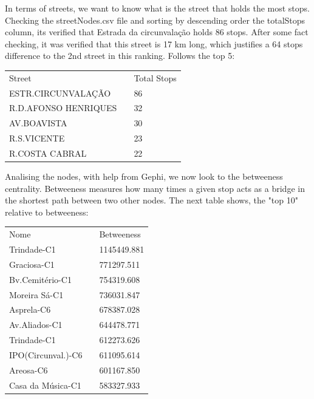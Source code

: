 \documentclass[12pt]{article}
\begin{document}
\begin{multicols}{2}
In terms of streets, we want to know what is the street that holds the most stops. Checking the streetNodes.csv file and sorting by descending order the totalStops column, its verified that Estrada da circunvalação holds 86 stops. After some fact checking, it was verified that this street is 17 km long, which justifies a 64 stops difference to the 2nd street in this ranking. Follows the top 5:
\begin{center}
\begin{tabular}[h]{|l|ll|}
\hline
Street && Total Stops\\
ESTR.CIRCUNVALAÇÃO && 86\\
R.D.AFONSO HENRIQUES && 32\\
AV.BOAVISTA	&& 30\\
R.S.VICENTE	&& 23\\
R.COSTA CABRAL && 22\\
\hline
\end{tabular}
\end{center} 
Analising the nodes, with help from Gephi, we now look to the betweeness centrality. Betweeness measures how many times a given stop acts as a bridge in the shortest path between two other nodes. The next table shows, the "top 10" relative to betweeness:\\
\begin{tabular}[h]{|l|ll|}
\hline
	Nome 				&& Betweeness\\
	Trindade-C1 		&& 1145449.881\\%
	Graciosa-C1 		&& 771297.511\\%
	Bv.Cemitério-C1 	&& 754319.608\\%
	Moreira Sá-C1 		&& 736031.847\\%
	Asprela-C6 			&& 678387.028\\%
	Av.Aliados-C1 		&& 644478.771\\%
	Trindade-C1			&& 612273.626\\%
	IPO(Circunval.)-C6 	&& 611095.614\\%
	Areosa-C6 			&& 601167.850\\%
	Casa da Música-C1 	&& 583327.933\\%
\hline
\end{tabular}



\end{multicols}
\end{document}
